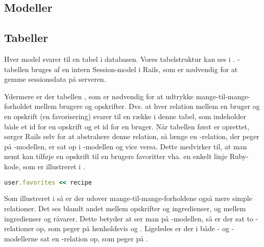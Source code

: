 \subsection{Modeller}



\subsection{Tabeller}
\label{sec:tabeller}

Hver model svarer til en tabel i databasen. Vores tabelstruktur kan ses i . -tabellen bruges af en intern Session-model i Rails, som er nødvendig for at gemme sessionsdata på serveren.

Ydermere er der tabellen , som er nødvendig for at udtrykke mange-til-mange-forholdet mellem brugere og opskrifter. Dvs. at hver relation mellem en bruger og en opskrift (en favorisering) svarer til en række i denne tabel, som indeholder både et id for en opskrift og et id for en bruger. Når tabellen først er oprettet, sørger Rails selv for at abstrahere denne relation, så længe en -relation, der peger på -modellen, er sat op i -modellen og vice versa. Dette medvirker til, at man \fx nemt kan tilføje en opskrift til en brugers favoritter vha. en enkelt linje Ruby-kode, som er illustreret i .

\begin{lstlisting}[caption={Hvis man har et \classref{User}-objekt i \texttt{user} (som f.eks. returneret med \lstinline{User.find_by_id(42)}) og et \classref{Recipe}-object i \texttt{recipe}, kan opskriften associeres med brugeren med denne linje Ruby-kode.},label=lst:rubymanytomany,language=Ruby]
user.favorites << recipe
\end{lstlisting}

Som illustreret i  så er der udover mange-til-mange-forholdene også mere simple relationer. Det ses blandt andet mellem opskrifter og ingredienser, og mellem ingredienser og råvarer. Dette betyder at ser man på -modellen, så er der sat to -relationer op, som peger på henholdsvis  og . Ligeledes er der i både - og -modellerne sat en -relation op, som peger på .

